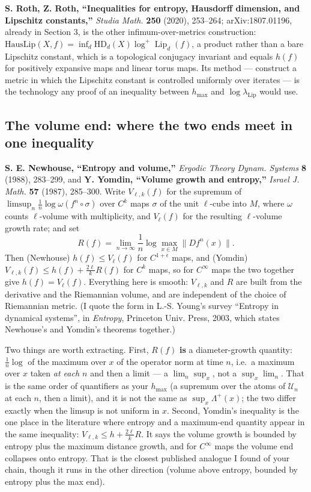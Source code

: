 \documentclass[
]{article}
\begin{document}
\textbf{S. Roth, Z. Roth, ``Inequalities for entropy, Hausdorff
dimension, and Lipschitz constants,''} \emph{Studia Math.} \textbf{250}
(2020), 253--264; arXiv:1807.01196, already in Section 3, is the other
infimum-over-metrics construction:
\(\mathrm{HausLip}(X,f)=\inf_d \mathrm{HD}_d(X)\log^+\operatorname{Lip}_d(f)\),
a product rather than a bare Lipschitz constant, which is a topological
conjugacy invariant and equals \(h(f)\) for positively expansive maps
and linear torus maps. Its method --- construct a metric in which the
Lipschitz constant is controlled uniformly over iterates --- is the
technology any proof of an inequality between \(h_{\max}\) and
\(\log\lambda_{\mathrm{Lip}}\) would use.

\subsection{The volume end: where the two ends meet in one
inequality}\label{the-volume-end-where-the-two-ends-meet-in-one-inequality}

\textbf{S. E. Newhouse, ``Entropy and volume,''} \emph{Ergodic Theory
Dynam. Systems} \textbf{8} (1988), 283--299, and \textbf{Y. Yomdin,
``Volume growth and entropy,''} \emph{Israel J. Math.} \textbf{57}
(1987), 285--300. Write \(V_{\ell,k}(f)\) for the supremum of
\(\limsup_n\frac1n\log\omega(f^n\circ\sigma)\) over \(C^k\) maps
\(\sigma\) of the unit \(\ell\)-cube into \(M\), where \(\omega\) counts
\(\ell\)-volume with multiplicity, and \(V_\ell(f)\) for the resulting
\(\ell\)-volume growth rate; and set \[
R(f)=\lim_{n\to\infty}\frac1n\log\max_{x\in M}\|Df^n(x)\|.
\] Then (Newhouse) \(h(f)\le V_{\ell}(f)\) for \(C^{1+\epsilon}\) maps,
and (Yomdin) \(V_{\ell,k}(f)\le h(f)+\frac{2\ell}{k}R(f)\) for \(C^k\)
maps, so for \(C^\infty\) maps the two together give \(h(f)=V_\ell(f)\).
Everything here is smooth: \(V_{\ell,k}\) and \(R\) are built from the
derivative and the Riemannian volume, and are independent of the choice
of Riemannian metric. (I quote the form in L.-S. Young's survey
``Entropy in dynamical systems'', in \emph{Entropy}, Princeton Univ.
Press, 2003, which states Newhouse's and Yomdin's theorems together.)

Two things are worth extracting. First, \(R(f)\) \textbf{is} a
diameter-growth quantity: \(\frac1n\log\) of the maximum over \(x\) of
the operator norm at time \(n\), i.e.~a maximum over \(x\) taken
\emph{at each \(n\)} and then a limit --- a \(\lim_n\sup_x\), not a
\(\sup_x\lim_n\). That is the same order of quantifiers as your
\(h_{\max}\) (a supremum over the atoms of \(\mathcal U_n\) at each
\(n\), then a limit), and it is not the same as \(\sup_x\Lambda^+(x)\);
the two differ exactly when the limsup is not uniform in \(x\). Second,
Yomdin's inequality is the one place in the literature where entropy and
a maximum-end quantity appear in the same inequality:
\(V_{\ell,k}\le h+\frac{2\ell}{k}R\). It says the volume growth is
bounded by entropy plus the maximum distance growth, and for
\(C^\infty\) maps the volume end collapses onto entropy. That is the
closest published analogue I found of your chain, though it runs in the
other direction (volume above entropy, bounded by entropy plus the max
end).
\end{document}
